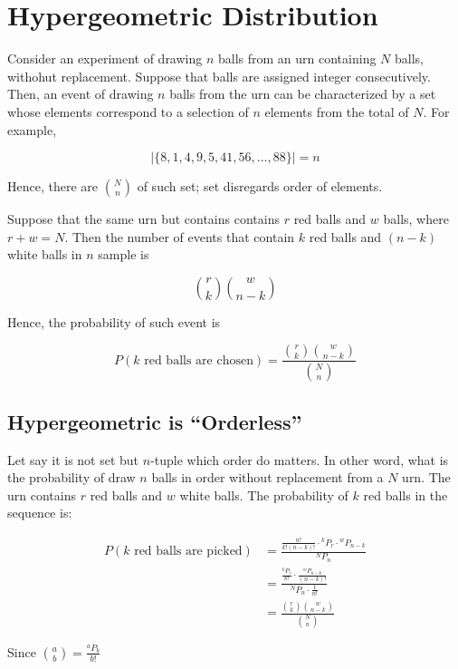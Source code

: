 \section{Hypergeometric Distribution}

\newcommand*{\permute}[2]{{}^{#1}P_{#2}}
Consider an experiment of drawing $n$ balls from an urn containing $N$ balls, withohut replacement. Suppose that balls are assigned integer consecutively. Then, an event of drawing $n$ balls from the urn can be characterized by a set whose elements correspond to a selection of $n$ elements from the total of $N$. For example,

\[
\left|\{8,1,4,9,5,41,56,\ldots, 88\}\right| = n
\]

Hence, there are $\binom{N}{n}$ of such set; set disregards order of elements.

Suppose that the same urn but contains contains $r$ red balls and $w$ balls, where $r+w=N$. Then the number of events that contain $k$ red balls and $(n-k)$ white balls in $n$ sample is

\[
\binom{r}{k}\binom{w}{n-k}  
\]

Hence, the probability of such event is

\[
P(k \text{ red balls are chosen}) = \frac{\binom{r}{k}\binom{w}{n-k}}{\binom{N}{n}}    
\]


\subsection{Hypergeometric is ``Orderless''}

Let say it is not set but $n$-tuple which order do matters. In other word, what is the probability of draw $n$ balls in order without replacement from a $N$ urn. The urn contains $r$ red balls and $w$ white balls. The probability of $k$ red balls in the sequence is:

\begin{align*}
    P(k \text{ red balls are picked}) 
    & = \frac{\frac{n!}{k!(n-k)!}\cdot\permute{k}{r}\cdot\permute{w}{n-k}}{\permute{N}{n}} \\
    & = \frac{\frac{\permute{k}{r}}{k!}\cdot\frac{\permute{w}{n-k}}{(n-k)!}}{\permute{N}{n} \cdot \frac{1}{n!}} \\
    & = \frac{\binom{r}{k}\binom{w}{n-k}}{\binom{N}{n}} 
\end{align*}

Since $\binom{a}{b} = \frac{\permute{a}{b}}{b!}$

